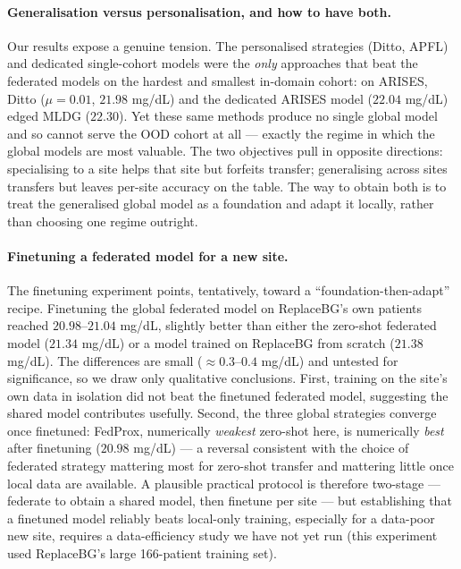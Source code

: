 \documentclass[10pt,letterpaper]{article}
\begin{document}
\paragraph{Generalisation versus personalisation, and how to have both.} Our
results expose a genuine tension. The personalised strategies (Ditto, APFL) and
dedicated single-cohort models were the \emph{only} approaches that beat the
federated models on the hardest and smallest in-domain cohort: on ARISES, Ditto
($\mu{=}0.01$, $21.98$ mg/dL) and the dedicated ARISES model ($22.04$ mg/dL) edged
MLDG ($22.30$). Yet these same methods produce no single global model and so
cannot serve the OOD cohort at all --- exactly the regime in which the global
models are most valuable. The two objectives pull in opposite directions:
specialising to a site helps that site but forfeits transfer; generalising across
sites transfers but leaves per-site accuracy on the table. The way to obtain both
is to treat the generalised global model as a foundation and adapt it locally,
rather than choosing one regime outright.

\paragraph{Finetuning a federated model for a new site.} The finetuning
experiment points, tentatively, toward a ``foundation-then-adapt'' recipe.
Finetuning the global federated model on ReplaceBG's own patients reached
$20.98$--$21.04$ mg/dL, slightly better than either the zero-shot federated model
($21.34$ mg/dL) or a model trained on ReplaceBG from scratch ($21.38$ mg/dL). The
differences are small ($\approx 0.3$--$0.4$ mg/dL) and untested for significance,
so we draw only qualitative conclusions. First, training on the site's own data
in isolation did not beat the finetuned federated model, suggesting the shared
model contributes usefully. Second, the three global strategies converge once
finetuned: FedProx, numerically \emph{weakest} zero-shot here, is numerically
\emph{best} after finetuning ($20.98$ mg/dL) --- a reversal consistent with the
choice of federated strategy mattering most for zero-shot transfer and mattering
little once local data are available. A
plausible practical protocol is therefore two-stage --- federate to obtain a
shared model, then finetune per site --- but establishing that a finetuned model
reliably beats local-only training, especially for a data-poor new site, requires
a data-efficiency study we have not yet run (this experiment used ReplaceBG's
large 166-patient training set).
\end{document}

